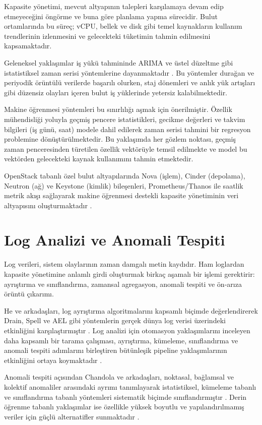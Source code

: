 Kapasite yönetimi, mevcut altyapının talepleri karşılamaya devam edip etmeyeceğini öngörme ve buna göre planlama yapma sürecidir.
Bulut ortamlarında bu süreç; vCPU, bellek ve disk gibi temel kaynakların kullanım trendlerinin izlenmesini ve gelecekteki tüketimin tahmin edilmesini kapsamaktadır.

Geleneksel yaklaşımlar iş yükü tahmininde ARIMA ve üstel düzeltme gibi istatistiksel zaman serisi yöntemlerine dayanmaktadır \autocite{calheiros2015}.
Bu yöntemler durağan ve periyodik örüntülü verilerde başarılı olurken, staj dönemleri ve anlık yük artışları gibi düzensiz olayları içeren bulut iş yüklerinde yetersiz kalabilmektedir.

Makine öğrenmesi yöntemleri bu sınırlılığı aşmak için önerilmiştir.
Özellik mühendisliği yoluyla geçmiş pencere istatistikleri, gecikme değerleri ve takvim bilgileri (iş günü, saat) modele dahil edilerek zaman serisi tahmini bir regresyon problemine dönüştürülmektedir.
Bu yaklaşımda her gözlem noktası, geçmiş zaman penceresinden türetilen özellik vektörüyle temsil edilmekte ve model bu vektörden gelecekteki kaynak kullanımını tahmin etmektedir.

OpenStack tabanlı özel bulut altyapılarında Nova (işlem), Cinder (depolama), Neutron (ağ) ve Keystone (kimlik) bileşenleri, Prometheus/Thanos ile saatlik metrik akışı sağlayarak makine öğrenmesi destekli kapasite yönetiminin veri altyapısını oluşturmaktadır \autocite{openstack2024}.


\section{Log Analizi ve Anomali Tespiti}

Log verileri, sistem olaylarının zaman damgalı metin kaydıdır.
Ham loglardan kapasite yönetimine anlamlı girdi oluşturmak birkaç aşamalı bir işlemi gerektirir: ayrıştırma ve sınıflandırma, zamansal agregasyon, anomali tespiti ve ön-arıza örüntü çıkarımı.

He ve arkadaşları, log ayrıştırma algoritmalarını kapsamlı biçimde değerlendirerek Drain, Spell ve AEL gibi yöntemlerin gerçek dünya log verisi üzerindeki etkinliğini karşılaştırmıştır \autocite{he2016}.
Log analizi için otomasyon yaklaşımlarını inceleyen daha kapsamlı bir tarama çalışması, ayrıştırma, kümeleme, sınıflandırma ve anomali tespiti adımlarını birleştiren bütünleşik pipeline yaklaşımlarının etkinliğini ortaya koymaktadır \autocite{he2021}.

Anomali tespiti açısından Chandola ve arkadaşları, noktasal, bağlamsal ve kolektif anomaliler arasındaki ayrımı tanımlayarak istatistiksel, kümeleme tabanlı ve sınıflandırma tabanlı yöntemleri sistematik biçimde sınıflandırmıştır \autocite{chandola2009}.
Derin öğrenme tabanlı yaklaşımlar ise özellikle yüksek boyutlu ve yapılandırılmamış veriler için güçlü alternatifler sunmaktadır \autocite{pang2021}.

